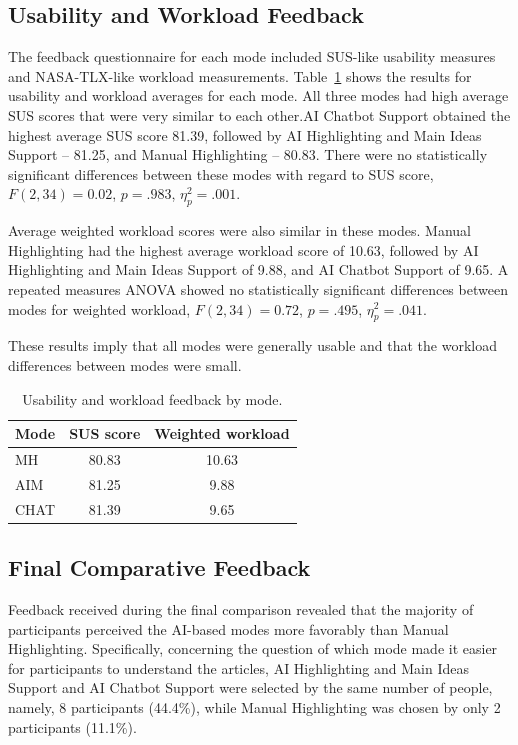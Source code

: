 \documentclass{IEEEtran}
\begin{document}
\subsection{Usability and Workload Feedback}

The feedback questionnaire for each mode included SUS-like usability measures and NASA-TLX-like workload measurements. Table~\ref{tab:usability_workload} shows the results for usability and workload averages for each mode. All three modes had high average SUS scores that were very similar to each other.AI Chatbot Support obtained the highest average SUS score 81.39, followed by AI Highlighting and Main Ideas Support – 81.25, and Manual Highlighting – 80.83. There were no statistically significant differences between these modes with regard to SUS score,
 $F(2,34)=0.02$, $p=.983$, $\eta_p^2=.001$.

Average weighted workload scores were also similar in these modes. Manual Highlighting had the highest average workload score of 10.63, followed by AI Highlighting and Main Ideas Support of 9.88, and AI Chatbot Support of 9.65. A repeated measures ANOVA showed no statistically significant differences between modes for weighted workload, $F(2,34)=0.72$, $p=.495$, $\eta_p^2=.041$.

These results imply that all modes were generally usable and that the workload differences between modes were small.

\begin{table}[H]
\centering
\caption{Usability and workload feedback by mode.}
\label{tab:usability_workload}
\scriptsize
\begin{tabular}{lcc}
\hline
Mode & SUS score & Weighted workload \\
\hline
MH & 80.83 & 10.63 \\
AIM & 81.25 & 9.88 \\
CHAT & 81.39 & 9.65 \\
\hline
\end{tabular}
\end{table}

\subsection{Final Comparative Feedback}

Feedback received during the final comparison revealed that the majority of participants perceived the AI-based modes more favorably than Manual Highlighting. Specifically, concerning the question of which mode made it easier for participants to understand the articles, AI Highlighting and Main Ideas Support and AI Chatbot Support were selected by the same number of people, namely, 8 participants (44.4\%), while Manual Highlighting was chosen by only 2 participants (11.1\%).
\end{document}
